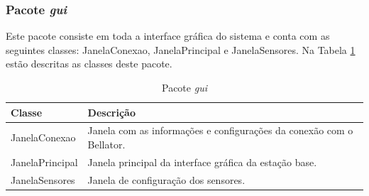 \subsubsection{Pacote \textit{gui}}

Este pacote consiste em toda a interface gráfica do sistema e conta com as seguintes classes: JanelaConexao, JanelaPrincipal e JanelaSensores. Na Tabela \ref{tab:pacote_interface_grafica} estão descritas as classes deste pacote.

\begin{table}[H]
  \centering
  \caption{Pacote \textit{gui}}
  \begin{tabular}{p{6cm}p{8cm}}
    \toprule
    \textbf{Classe} & \textbf{Descrição} \\ 
    \midrule
    JanelaConexao & Janela com as informações e configurações da conexão com o Bellator. \\ \hline
    JanelaPrincipal & Janela principal da interface gráfica da estação base. \\ \hline
    JanelaSensores & Janela de configuração dos sensores. \\ 
    \bottomrule
  \end{tabular}%
  \label{tab:pacote_interface_grafica}%
\end{table}%

% 
% 

% 
% 

